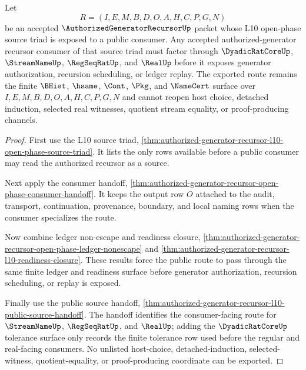 \begin{theorem}
\label{thm:authorized-generator-recursor-l10-source-triad-public-export}
Let
$$
R=(I,E,M,B,D,O,A,H,C,P,G,N)
$$
be an accepted $\AuthorizedGeneratorRecursorUp$ packet whose L10 open-phase source triad is exposed to a public consumer. Any accepted authorized-generator recursor consumer of that source triad must factor through $\DyadicRatCoreUp$, $\StreamNameUp$, $\RegSeqRatUp$, and $\RealUp$ before it exposes generator authorization, recursion scheduling, or ledger replay. The exported route remains the finite $\BHist$, $\hsame$, $\Cont$, $\Pkg$, and $\NameCert$ surface over $I,E,M,B,D,O,A,H,C,P,G,N$ and cannot reopen host choice, detached induction, selected real witnesses, quotient stream equality, or proof-producing channels.
\end{theorem}
\begin{proof}
First use the L10 source triad, \autoref{thm:authorized-generator-recursor-l10-open-phase-source-triad}. It lists the only rows available before a public consumer may read the authorized recursor as a source.

Next apply the consumer handoff, \autoref{thm:authorized-generator-recursor-open-phase-consumer-handoff}. It keeps the output row $O$ attached to the audit, transport, continuation, provenance, boundary, and local naming rows when the consumer specializes the route.

Now combine ledger non-escape and readiness closure, \autoref{thm:authorized-generator-recursor-open-phase-ledger-nonescape} and \autoref{thm:authorized-generator-recursor-l10-readiness-closure}. These results force the public route to pass through the same finite ledger and readiness surface before generator authorization, recursion scheduling, or replay is exposed.

Finally use the public source handoff, \autoref{thm:authorized-generator-recursor-l10-public-source-handoff}. The handoff identifies the consumer-facing route for $\StreamNameUp$, $\RegSeqRatUp$, and $\RealUp$; adding the $\DyadicRatCoreUp$ tolerance surface only records the finite tolerance row used before the regular and real-facing consumers. No unlisted host-choice, detached-induction, selected-witness, quotient-equality, or proof-producing coordinate can be exported.
\end{proof}

